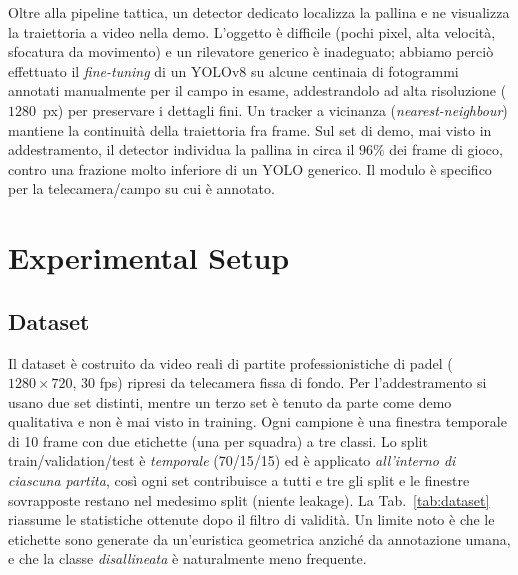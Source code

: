 \documentclass[10pt,twocolumn,a4paper]{article}
\begin{document}
	Oltre alla pipeline tattica, un detector dedicato localizza la pallina e ne
	visualizza la traiettoria a video nella demo. L'oggetto è difficile (pochi
	pixel, alta velocità, sfocatura da movimento) e un rilevatore generico è
	inadeguato; abbiamo perciò effettuato il \emph{fine-tuning} di un YOLOv8 su
	alcune centinaia di fotogrammi annotati manualmente per il campo in esame,
	addestrandolo ad alta risoluzione ($1280$~px) per preservare i dettagli fini.
	Un tracker a vicinanza (\emph{nearest-neighbour}) mantiene la continuità della
	traiettoria fra frame. Sul set di demo, mai visto in addestramento, il detector
	individua la pallina in circa il $96\%$ dei frame di gioco, contro una frazione
	molto inferiore di un YOLO generico. Il modulo è specifico per la
	telecamera/campo su cui è annotato.

	\section{Experimental Setup}
	\label{sec:setup}

	\subsection{Dataset}

	Il dataset è costruito da video reali di partite professionistiche di padel
	($1280\times720$, 30 fps) ripresi da telecamera fissa di fondo. Per
	l'addestramento si usano due set distinti, mentre un terzo set è tenuto da
	parte come demo qualitativa e non è mai visto in training. Ogni campione è una
	finestra temporale di 10 frame con due etichette (una per squadra) a tre
	classi. Lo split train/validation/test è \emph{temporale} (70/15/15) ed è
	applicato \emph{all'interno di ciascuna partita}, così ogni set contribuisce a
	tutti e tre gli split e le finestre sovrapposte restano nel medesimo split
	(niente leakage). La Tab.~\ref{tab:dataset} riassume le statistiche ottenute
	dopo il filtro di validità. Un limite noto è che le etichette sono generate da
	un'euristica geometrica anziché da annotazione umana, e che la classe
	\emph{disallineata} è naturalmente meno frequente.
\end{document}

